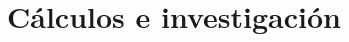 \documentclass[12pt,a4paper]{report}
\begin{document}
	

	\clearpage
	\thispagestyle{empty}
	
	\tableofcontents
	
	\chapter*{Cálculos e investigación}
	
\end{document}
